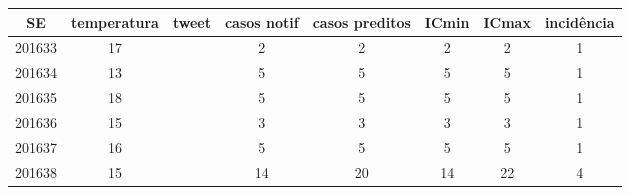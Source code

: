 \begin{tabular}{c|ccccccc}
  \hline
SE & temperatura & tweet & casos notif & casos preditos & ICmin & ICmax & incidência \\ 
  \hline
201633 & 17 &  & 2 & 2 & 2 & 2 & 1 \\ 
  201634 & 13 &  & 5 & 5 & 5 & 5 & 1 \\ 
  201635 & 18 &  & 5 & 5 & 5 & 5 & 1 \\ 
  201636 & 15 &  & 3 & 3 & 3 & 3 & 1 \\ 
  201637 & 16 &  & 5 & 5 & 5 & 5 & 1 \\ 
  201638 & 15 &  & 14 & 20 & 14 & 22 & 4 \\ 
   \hline
\end{tabular}
